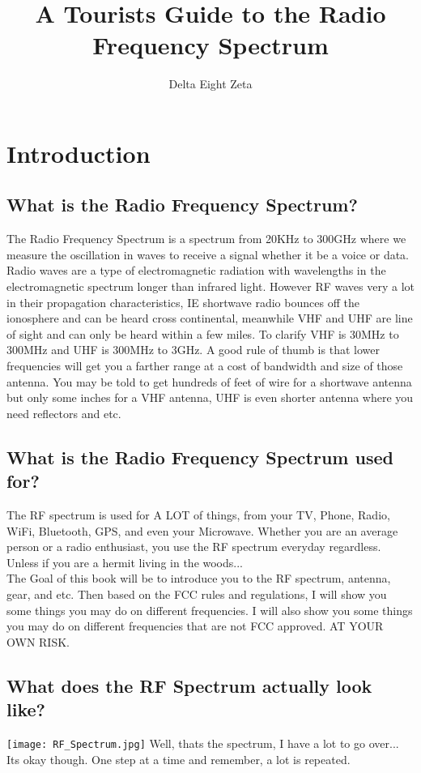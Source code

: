 \documentclass{book}
\title{A Tourists Guide to the Radio Frequency Spectrum}
\author{Delta Eight Zeta}
\begin{document}
    \maketitle
    \tableofcontents


    \chapter{Introduction}
    \section{What is the Radio Frequency Spectrum?}
        The Radio Frequency Spectrum is a spectrum from 20KHz to 300GHz where we measure the oscillation in waves to receive a signal whether it be a voice or data.
        Radio waves are a type of electromagnetic radiation with wavelengths in the electromagnetic spectrum longer than infrared light. 
        However RF waves very a lot in their propagation characteristics, IE shortwave radio bounces off the ionosphere and can be heard cross continental,
        meanwhile VHF and UHF are line of sight and can only be heard within a few miles.
        To clarify VHF is 30MHz to 300MHz and UHF is 300MHz to 3GHz. A good rule of thumb is that lower frequencies will get you a farther range at a cost
        of bandwidth and size of those antenna. You may be told to get hundreds of feet of wire for a shortwave antenna but only some inches for a VHF antenna,
        UHF is even shorter antenna where you need reflectors and etc.
    \section{What is the Radio Frequency Spectrum used for?}
        The RF spectrum is used for A LOT of things, from your TV, Phone, Radio, WiFi, Bluetooth, GPS, and even your Microwave.
        Whether you are an average person or a radio enthusiast, you use the RF spectrum everyday regardless. Unless if you are a 
        hermit living in the woods...
        \\
        The Goal of this book will be to introduce you to the RF spectrum, antenna, gear, and etc.
        Then based on the FCC rules and regulations, I will show you some things you may do on different frequencies.
        I will also show you some things you may do on different frequencies that are not FCC approved. AT YOUR OWN RISK.
    \section{What does the RF Spectrum actually look like?}
    \texttt{[image: RF\_Spectrum.jpg]}
        Well, thats the spectrum, I have a lot to go over... Its okay though.
        One step at a time and remember, a lot is repeated.
\end{document}
